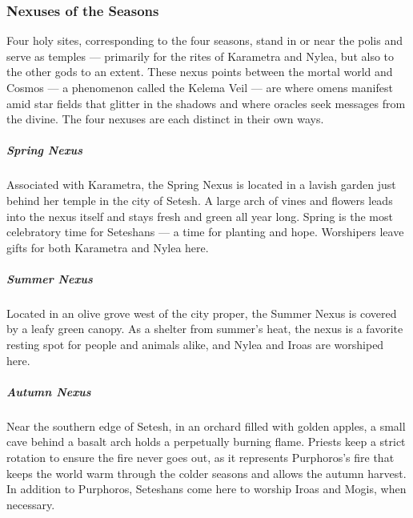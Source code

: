     \subsubsection{Nexuses of the Seasons}
        Four holy sites, corresponding to the four seasons, stand in or near the polis and serve as temples --- primarily for the rites of Karametra and Nylea, but also to the other gods to an extent.
        These nexus points between the mortal world and Cosmos --- a phenomenon called the Kelema Veil --- are where omens manifest amid star fields that glitter in the shadows and where oracles seek messages from the divine. The four nexuses are each distinct in their own ways.

        \subparagraph{Spring Nexus} Associated with Karametra, the Spring Nexus is located in a lavish garden just behind her temple in the city of Setesh.
        A large arch of vines and flowers leads into the nexus itself and stays fresh and green all year long.
        Spring is the most celebratory time for Seteshans --- a time for planting and hope.
        Worshipers leave gifts for both Karametra and Nylea here.

        \subparagraph{Summer Nexus} Located in an olive grove west of the city proper, the Summer Nexus is covered by a leafy green canopy.
        As a shelter from summer's heat, the nexus is a favorite resting spot for people and animals alike, and Nylea and Iroas are worshiped here.

        \subparagraph{Autumn Nexus} Near the southern edge of Setesh, in an orchard filled with golden apples, a small cave behind a basalt arch holds a perpetually burning flame.
        Priests keep a strict rotation to ensure the fire never goes out, as it represents Purphoros's fire that keeps the world warm through the colder seasons and allows the autumn harvest.
        In addition to Purphoros, Seteshans come here to worship Iroas and Mogis, when necessary.

        \pagebreak


